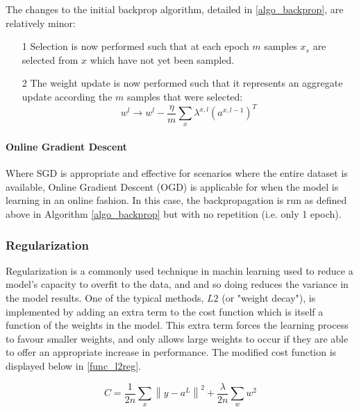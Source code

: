 \documentclass[a4paper,latin]{paper}
\begin{document}
The changes to the initial backprop algorithm, detailed in \ref{algo_backprop}, are relatively minor:
\begin{itemize}
	\item [1] Selection is now performed such that at each epoch $m$ samples $x_s$ are selected from $x$ which have not yet been sampled.
	\item [2] The weight update is now performed such that it represents an aggregate update according the $m$ samples that were selected:
			\begin{equation}\label{eq_backprop_weightupdate_sgd}
			w^l \rightarrow w^l - \frac{\eta}{m} \sum_{x} \lambda^{x, l} (a^{x, l - 1})^T
			\end{equation}
\end{itemize}

\texttt{}\newline 

\paragraph{Online Gradient Descent}
Where SGD is appropriate and effective for scenarios where the entire dataset is available, Online Gradient Descent (OGD) is applicable for when the model is learning in an online fashion. In this case, the backpropagation is run as defined above in Algorithm \ref{algo_backprop} but with no repetition (i.e. only 1 epoch).

\subsubsection{Regularization}\label{imp_regularization}

Regularization is a commonly used technique in machin learning used to reduce a model's capacity to overfit to the data, and and so doing reduces the variance in the model results. One of the typical methods, $L2$ (or "weight decay"), is implemented by adding an extra term to the cost function which is itself a function of the weights in the model. This extra term forces the learning process to favour smaller weights, and only allows large weights to occur if they are able to offer an appropriate increase in performance. The modified cost function is displayed below in \ref{func_l2reg}.

\begin{equation}\label{func_l2reg}
C=\frac{1}{2 n} \sum_{x}\left\|y-a^{L}\right\|^{2}+\frac{\lambda}{2 n} \sum_{w} w^{2}
\end{equation}
\end{document}
